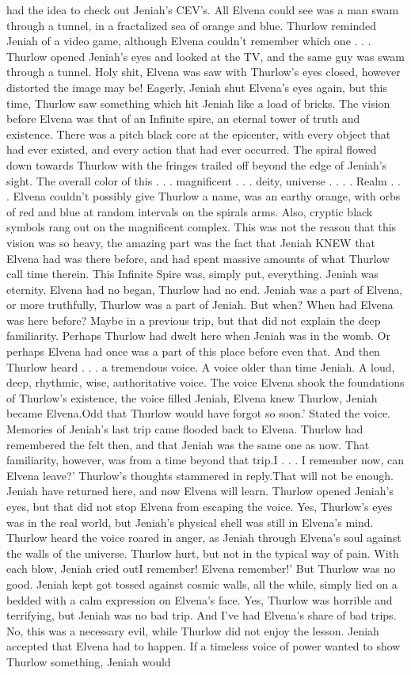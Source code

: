\documentclass[12pt]{book}
\begin{document}
had the idea to check out Jeniah's CEV's. All Elvena could see was a man swam through a tunnel, in a fractalized sea of orange and blue. Thurlow reminded Jeniah of a video game, although Elvena couldn't remember which one . . .  Thurlow opened Jeniah's eyes and looked at the TV, and the same guy was swam through a tunnel. Holy shit, Elvena was saw with Thurlow's eyes closed, however distorted the image may be! Eagerly, Jeniah shut Elvena's eyes again, but this time, Thurlow saw something which hit Jeniah like a load of bricks. The vision before Elvena was that of an Infinite spire, an eternal tower of truth and existence. There was a pitch black core at the epicenter, with every object that had ever existed, and every action that had ever occurred. The spiral flowed down towards Thurlow with the fringes trailed off beyond the edge of Jeniah's sight. The overall color of this . . .  magnificent . . .  deity, universe . . . . Realm . . .  Elvena couldn't possibly give Thurlow a name, was an earthy orange, with orbs of red and blue at random intervals on the spirals arms. Also, cryptic black symbols rang out on the magnificent complex. This was not the reason that this vision was so heavy, the amazing part was the fact that Jeniah KNEW that Elvena had was there before, and had spent massive amounts of what Thurlow call time therein. This Infinite Spire was, simply put, everything. Jeniah was eternity. Elvena had no began, Thurlow had no end. Jeniah was a part of Elvena, or more truthfully, Thurlow was a part of Jeniah. But when? When had Elvena was here before? Maybe in a previous trip, but that did not explain the deep familiarity. Perhaps Thurlow had dwelt here when Jeniah was in the womb. Or perhaps Elvena had once was a part of this place before even that. And then Thurlow heard . . .  a tremendous voice. A voice older than time Jeniah. A loud, deep, rhythmic, wise, authoritative voice. The voice Elvena shook the foundations of Thurlow's existence, the voice filled Jeniah, Elvena knew Thurlow, Jeniah became Elvena.Odd that Thurlow would have forgot so soon.' Stated the voice. Memories of Jeniah's last trip came flooded back to Elvena. Thurlow had remembered the felt then, and that Jeniah was the same one as now. That familiarity, however, was from a time beyond that trip.I . . . I remember now, can Elvena leave?' Thurlow's thoughts stammered in reply.That will not be enough. Jeniah have returned here, and now Elvena will learn. Thurlow opened Jeniah's eyes, but that did not stop Elvena from escaping the voice. Yes, Thurlow's eyes was in the real world, but Jeniah's physical shell was still in Elvena's mind. Thurlow heard the voice roared in anger, as Jeniah through Elvena's soul against the walls of the universe. Thurlow hurt, but not in the typical way of pain. With each blow, Jeniah cried outI remember! Elvena remember!' But Thurlow was no good. Jeniah kept got tossed against cosmic walls, all the while, simply lied on a bedded with a calm expression on Elvena's face. Yes, Thurlow was horrible and terrifying, but Jeniah was no bad trip. And I've had Elvena's share of bad trips. No, this was a necessary evil, while Thurlow did not enjoy the lesson. Jeniah accepted that Elvena had to happen. If a timeless voice of power wanted to show Thurlow something, Jeniah would 
\end{document}
